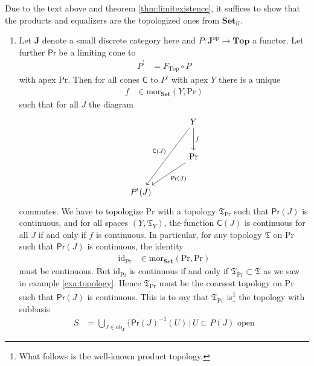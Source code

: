 \begin{prf}
Due to the text above and theorem \ref{thm:limitexistence}, it suffices to show that the products and equalizers are the topologized ones from $\mathbf{Set}_{\mathcal{U}}$.
\begin{enumerate}
\item[(a)]
Let $\mathbf{J}$ denote a small discrete category here and $P \colon \mathbf{J}^{\mathrm{op}} \rightarrow \mathbf{Top}$ a functor.
Let further $\mathsf{Pr}$ be a limiting cone to
\begin{align*}
  P^{\backprime}
  &=
  F_{\mathrm{Top}}
  \circ
  P
\end{align*}
with apex $\mathrm{Pr}$.
Then for all cones $\mathsf{C}$ to $P^{\backprime}$ with apex $Y$ there is a unique
\begin{align*}
  f
  &\in
  \mathrm{mor}_{\mathbf{Set}}
  \left(
    Y,
    \mathrm{Pr}
  \right)
\end{align*}
such that for all $J$ the diagram
\[
\begin{tikzcd}[sep=large]
  &
  Y
  \arrow{d}{f}
  \arrow[swap]{ddl}{\mathsf{C}(J)}
  \\
  &
  \mathrm{Pr}
  \arrow{dl}{\mathsf{Pr}(J)}
  \\
  P^{\backprime}(J)
\end{tikzcd}
\]
commutes.
We have to topologize $\mathrm{Pr}$ with a topology $\mathfrak{T}_{\mathrm{Pr}}$ such that $\mathsf{Pr}(J)$ is continuous, and for all spaces $(Y,\mathfrak{T}_{Y})$, the function $\mathsf{C}(J)$ is continuous for all $J$ if and only if $f$ is continuous.
In particular, for any topology $\mathfrak{T}$ on $\mathrm{Pr}$ such that $\mathsf{Pr}(J)$ is continuous, the identity
\begin{align*}
  \mathrm{id}_{\mathrm{Pr}}
  &\in
  \mathrm{mor}_{\mathbf{Set}}
  \left(
    \mathrm{Pr},
    \mathrm{Pr}
  \right)
\end{align*}
must be continuous.
But $\mathrm{id}_{\mathrm{Pr}}$ is continuous if and only if $\mathfrak{T}_{\mathrm{Pr}} \subset \mathfrak{T}$ as we saw in example \ref{exa:topology}.
Hence $\mathfrak{T}_{\mathrm{Pr}}$ must be the coarsest topology on $\mathrm{Pr}$ such that $\mathsf{Pr}(J)$ is continuous.
This is to say that $\mathfrak{T}_{\mathrm{Pr}}$ is\footnote{What follows is the well-known product topology.} the topology with subbasis
\begin{align*}
  S
  &=
  \bigcup_{J \in \mathrm{ob}_{\mathbf{J}}}
  \lbrace
      \mathsf{Pr}(J)^{-1}(U)
    \,
    \vert
    \,
      U
      \subset
      P(J)
      \text{ open}

\end{align*}
\end{enumerate}
\end{prf}
